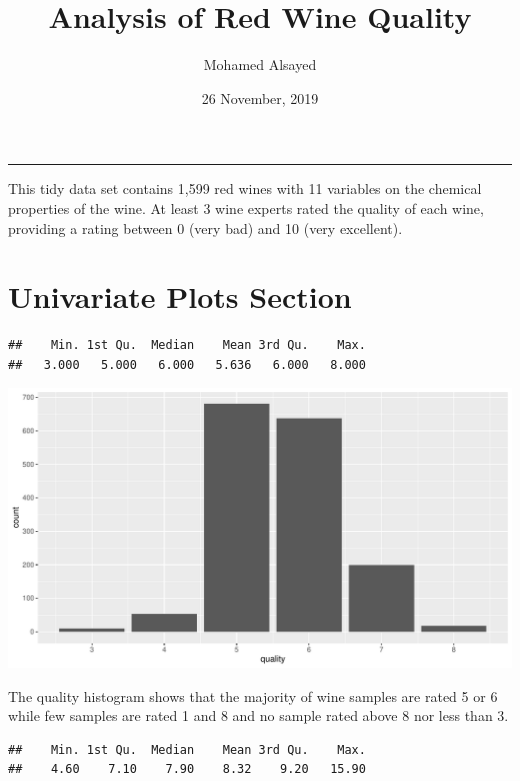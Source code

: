 \documentclass[]{article}
\title{Analysis of Red Wine Quality}
\author{Mohamed Alsayed}
\date{26 November, 2019}
\begin{document}
\maketitle

\begin{center}\rule{0.5\linewidth}{\linethickness}\end{center}

This tidy data set contains 1,599 red wines with 11 variables on the
chemical properties of the wine. At least 3 wine experts rated the
quality of each wine, providing a rating between 0 (very bad) and 10
(very excellent).

\hypertarget{univariate-plots-section}{%
\section{Univariate Plots Section}\label{univariate-plots-section}}

\begin{verbatim}
##    Min. 1st Qu.  Median    Mean 3rd Qu.    Max. 
##   3.000   5.000   6.000   5.636   6.000   8.000
\end{verbatim}

\begin{center}\includegraphics{Figs/Univariate_Plots-1} \end{center}

The quality histogram shows that the majority of wine samples are rated
5 or 6 while few samples are rated 1 and 8 and no sample rated above 8
nor less than 3.

\begin{verbatim}
##    Min. 1st Qu.  Median    Mean 3rd Qu.    Max. 
##    4.60    7.10    7.90    8.32    9.20   15.90
\end{verbatim}
\end{document}
